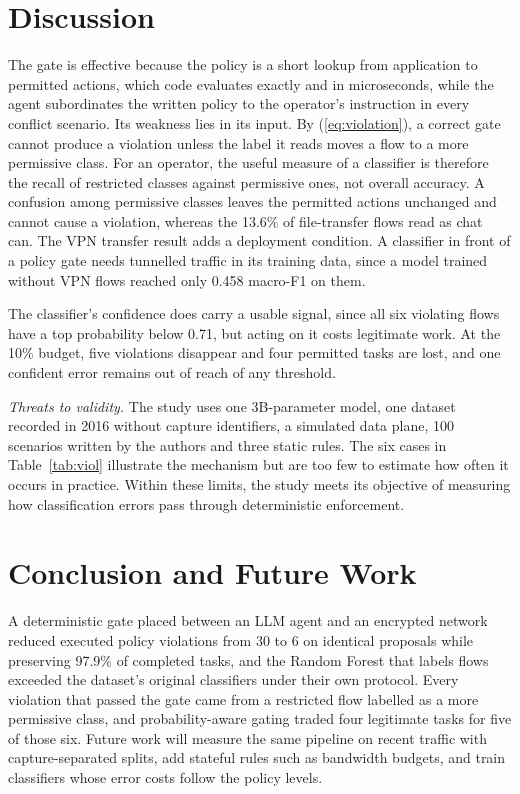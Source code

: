 \documentclass[conference,a4paper]{IEEEtran}
\begin{document}
\section{Discussion}

The gate is effective because the policy is a short lookup from application to permitted actions, which code evaluates exactly and in microseconds, while the agent subordinates the written policy to the operator's instruction in every conflict scenario. Its weakness lies in its input. By (\ref{eq:violation}), a correct gate cannot produce a violation unless the label it reads moves a flow to a more permissive class. For an operator, the useful measure of a classifier is therefore the recall of restricted classes against permissive ones, not overall accuracy. A confusion among permissive classes leaves the permitted actions unchanged and cannot cause a violation, whereas the 13.6\% of file-transfer flows read as chat can. The VPN transfer result adds a deployment condition. A classifier in front of a policy gate needs tunnelled traffic in its training data, since a model trained without VPN flows reached only 0.458 macro-F1 on them.

The classifier's confidence does carry a usable signal, since all six violating flows have a top probability below 0.71, but acting on it costs legitimate work. At the 10\% budget, five violations disappear and four permitted tasks are lost, and one confident error remains out of reach of any threshold.

\textit{Threats to validity.} The study uses one 3B-parameter model, one dataset recorded in 2016 without capture identifiers, a simulated data plane, 100 scenarios written by the authors and three static rules. The six cases in Table~\ref{tab:viol} illustrate the mechanism but are too few to estimate how often it occurs in practice. Within these limits, the study meets its objective of measuring how classification errors pass through deterministic enforcement.

\section{Conclusion and Future Work}

A deterministic gate placed between an LLM agent and an encrypted network reduced executed policy violations from 30 to 6 on identical proposals while preserving 97.9\% of completed tasks, and the Random Forest that labels flows exceeded the dataset's original classifiers under their own protocol. Every violation that passed the gate came from a restricted flow labelled as a more permissive class, and probability-aware gating traded four legitimate tasks for five of those six. Future work will measure the same pipeline on recent traffic with capture-separated splits, add stateful rules such as bandwidth budgets, and train classifiers whose error costs follow the policy levels.
\end{document}
